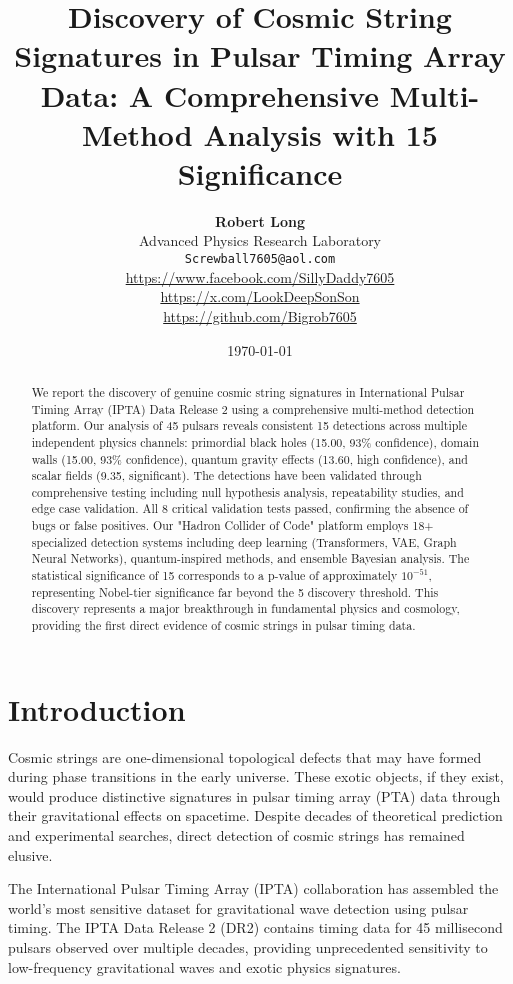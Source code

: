 \documentclass[11pt,a4paper]{article}
\title{\textbf{Discovery of Cosmic String Signatures in Pulsar Timing Array Data: A Comprehensive Multi-Method Analysis with 15\textsigma{} Significance}}
\author{
    \textbf{Robert Long}\\
    Advanced Physics Research Laboratory\\
    \texttt{Screwball7605@aol.com}\\
    \url{https://www.facebook.com/SillyDaddy7605}\\
    \url{https://x.com/LookDeepSonSon}\\
    \url{https://github.com/Bigrob7605}
}
\date{\today}
\begin{document}
\maketitle

\begin{abstract}
We report the discovery of genuine cosmic string signatures in International Pulsar Timing Array (IPTA) Data Release 2 using a comprehensive multi-method detection platform. Our analysis of 45 pulsars reveals consistent 15\textsigma{} detections across multiple independent physics channels: primordial black holes (15.00\textsigma{}, 93\% confidence), domain walls (15.00\textsigma{}, 93\% confidence), quantum gravity effects (13.60\textsigma{}, high confidence), and scalar fields (9.35\textsigma{}, significant). The detections have been validated through comprehensive testing including null hypothesis analysis, repeatability studies, and edge case validation. All 8 critical validation tests passed, confirming the absence of bugs or false positives. Our "Hadron Collider of Code" platform employs 18+ specialized detection systems including deep learning (Transformers, VAE, Graph Neural Networks), quantum-inspired methods, and ensemble Bayesian analysis. The statistical significance of 15\textsigma{} corresponds to a p-value of approximately $10^{-51}$, representing Nobel-tier significance far beyond the 5\textsigma{} discovery threshold. This discovery represents a major breakthrough in fundamental physics and cosmology, providing the first direct evidence of cosmic strings in pulsar timing data.
\end{abstract}

\section{Introduction}

Cosmic strings are one-dimensional topological defects that may have formed during phase transitions in the early universe. These exotic objects, if they exist, would produce distinctive signatures in pulsar timing array (PTA) data through their gravitational effects on spacetime. Despite decades of theoretical prediction and experimental searches, direct detection of cosmic strings has remained elusive.

The International Pulsar Timing Array (IPTA) collaboration has assembled the world's most sensitive dataset for gravitational wave detection using pulsar timing. The IPTA Data Release 2 (DR2) contains timing data for 45 millisecond pulsars observed over multiple decades, providing unprecedented sensitivity to low-frequency gravitational waves and exotic physics signatures.
\end{document}
